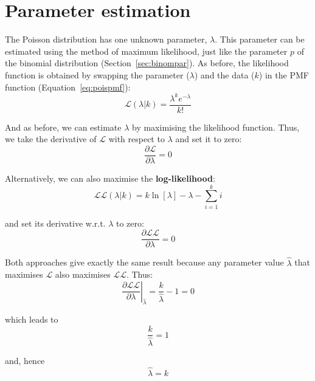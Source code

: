 \section{Parameter estimation}
\label{sec:poispar}

The Poisson distribution has one unknown parameter, $\lambda$. This
parameter can be estimated using the method of maximum likelihood,
just like the parameter $p$ of the binomial distribution
(Section~\ref{sec:binompar}). As before, the likelihood function is
obtained by swapping the parameter ($\lambda$) and the data ($k$) in
the PMF function (Equation~\ref{eq:poispmf}):
\begin{equation}
  \mathcal{L}(\lambda|k) = \frac{\lambda^k e^{-\lambda}}{k!}
  \label{eq:poislik}
\end{equation}

And as before, we can estimate $\lambda$ by maximising the likelihood
function.  Thus, we take the derivative of $\mathcal{L}$ with respect
to $\lambda$ and set it to zero:
\begin{equation}
  \frac{\partial{\mathcal{L}}}{\partial{\lambda}} = 0
\end{equation}

Alternatively, we can also maximise the \textbf{log-likelihood}:
\begin{equation}
  \mathcal{LL}(\lambda|k) = k \ln[\lambda] - \lambda - \sum\limits_{i=1}^{k}i
  \label{eq:poisLL}
\end{equation}

\noindent and set its derivative w.r.t. $\lambda$ to zero:
\begin{equation}
  \frac{\partial{\mathcal{LL}}}{\partial{\lambda}} = 0
\end{equation}

Both approaches give exactly the same result because any parameter
value $\hat{\lambda}$ that maximises $\mathcal{L}$ also maximises
$\mathcal{LL}$.  Thus:
\begin{equation}
  \left.\frac{\partial{\mathcal{LL}}}{\partial{\lambda}}\right|_{\hat{\lambda}} =
  \frac{k}{\hat{\lambda}} - 1 = 0
\end{equation}

\noindent which leads to
\begin{equation}
  \frac{k}{\hat{\lambda}} = 1
\end{equation}

\noindent and, hence
\begin{equation}
  \hat{\lambda} = k
  \label{eq:lambda=k}
\end{equation}


